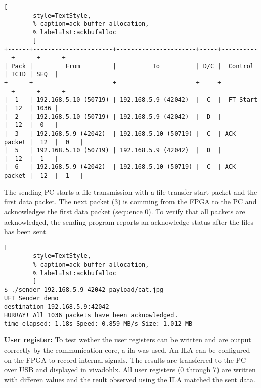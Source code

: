 \vspace{1ex}
\begin{minipage}{1\linewidth}
    \begin{lstlisting}[
        style=TextStyle, 
        % caption=ack buffer allocation, 
        % label=lst:ackbufalloc
        ]
+------+----------------------+----------------------+-----+------------+------+------+
| Pack |         From         |          To          | D/C |  Control   | TCID | SEQ  | 
+------+----------------------+----------------------+-----+------------+------+------+
|  1   | 192.168.5.10 (50719) | 192.168.5.9 (42042)  |  C  |  FT Start  |  12  | 1036 |
|  2   | 192.168.5.10 (50719) | 192.168.5.9 (42042)  |  D  |            |  12  |  0   |
|  3   | 192.168.5.9 (42042)  | 192.168.5.10 (50719) |  C  | ACK packet |  12  |  0   |
|  5   | 192.168.5.10 (50719) | 192.168.5.9 (42042)  |  D  |            |  12  |  1   |
|  6   | 192.168.5.9 (42042)  | 192.168.5.10 (50719) |  C  | ACK packet |  12  |  1   |
\end{lstlisting}
\end{minipage}

\vspace{1ex}
The sending PC starts a file transmission with a file transfer start packet and
the first data packet. The next packet (3) is comming from the FPGA to the PC
and acknowledges the first data packet (sequence 0). To verify that all packets
are acknowledged, the sending program reports an acknowledge status after the
files has been sent. 

\begin{minipage}{1\linewidth}
    \begin{lstlisting}[
        style=TextStyle, 
        % caption=ack buffer allocation, 
        % label=lst:ackbufalloc
        ]
$ ./sender 192.168.5.9 42042 payload/cat.jpg
UFT Sender demo
destination 192.168.5.9:42042
HURRAY! All 1036 packets have been acknowledged.
time elapsed: 1.18s Speed: 0.859 MB/s Size: 1.012 MB\end{lstlisting}
\end{minipage}

\vspace{1ex}
\textbf{User register:} To test wether the user registers can be written and are
output correctly by the communication core, a \gls{ila} 
was used. An ILA can be configured on the FPGA to record internal signals. The
results are transferred to the PC over USB and displayed in \gls{vivadohlx}. All
user registers (0 through 7) are written with differen values and the reult
observed using the ILA matched the sent data.


